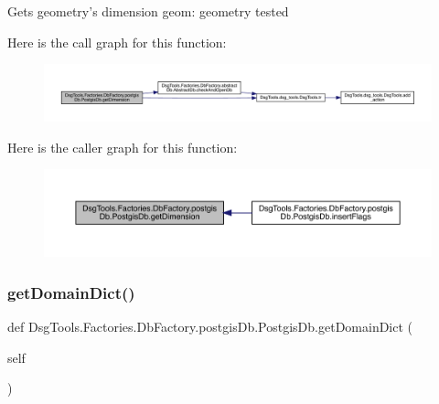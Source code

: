 \begin{DoxyVerb}Gets geometry's dimension
geom: geometry tested
\end{DoxyVerb}
 Here is the call graph for this function\+:
\nopagebreak
\begin{figure}[H]
\begin{center}
\leavevmode
\includegraphics[width=350pt]{class_dsg_tools_1_1_factories_1_1_db_factory_1_1postgis_db_1_1_postgis_db_a22c4806047ef96cae9dedc2966196272_cgraph}
\end{center}
\end{figure}
Here is the caller graph for this function\+:
\nopagebreak
\begin{figure}[H]
\begin{center}
\leavevmode
\includegraphics[width=350pt]{class_dsg_tools_1_1_factories_1_1_db_factory_1_1postgis_db_1_1_postgis_db_a22c4806047ef96cae9dedc2966196272_icgraph}
\end{center}
\end{figure}
\mbox{\label{class_dsg_tools_1_1_factories_1_1_db_factory_1_1postgis_db_1_1_postgis_db_a7b09d35205eb58213e342938f1c498f4}} 
\subsubsection{\texorpdfstring{get\+Domain\+Dict()}{getDomainDict()}}
{\footnotesize\ttfamily def Dsg\+Tools.\+Factories.\+Db\+Factory.\+postgis\+Db.\+Postgis\+Db.\+get\+Domain\+Dict (\begin{DoxyParamCaption}\item[{}]{self }\end{DoxyParamCaption})}

